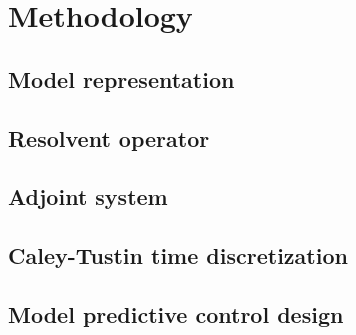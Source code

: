 \section{Methodology}



\subsection{Model representation}



\subsection{Resolvent operator}



\subsection{Adjoint system}



\subsection{Caley-Tustin time discretization}



\subsection{Model predictive control design}
